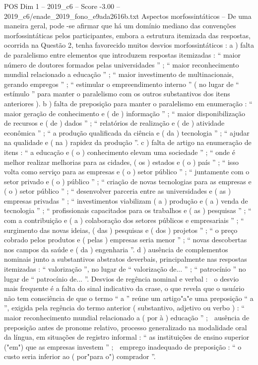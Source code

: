 \begin{textsample}{POS Dim 1 – 2019\_c6 – Score -3.00 – 2019\_c6/enade\_2019\_fono\_e9ada2616b.txt}
Aspectos morfossintáticos – De uma maneira geral, pode -se afirmar que há um domínio mediano das convenções morfossintáticas pelos participantes, embora a estrutura itemizada das respostas, ocorrida na Questão 2, tenha favorecido muitos desvios morfossintáticos : a ) falta de paralelismo entre elementos que introduzem respostas itemizadas : “ maior número de doutores formados pelas universidades ” ; “ maior reconhecimento mundial relacionado a educação ” ; “ maior investimento de multinacionais, gerando empregos ” ; “ estimular o empreendimento interno ” ( no lugar de “ estímulo ” para manter o paralelismo com os outros substantivos dos itens anteriores ). b ) falta de preposição para manter o paralelismo em enumeração : “ maior geração de conhecimento e ( de ) informação ” ; “ maior disponibilização de recursos e ( de ) dados ” ; “ relatórios de realização e ( de ) atividade econômica ” ; “ a produção qualificada da ciência e ( da ) tecnologia ” ; “ ajudar na qualidade e ( na ) rapidez da produção ”. c ) falta de artigo na enumeração de itens : “ a educação e ( o ) conhecimento elevam uma sociedade ” ; “ onde é melhor realizar melhorias para as cidades, ( os ) estados e ( o ) país ” ; “ isso volta como serviço para as empresas e ( o ) setor público ” ; “ juntamente com o setor privado e ( o ) público ” ; “ criação de novas tecnologias para as empresas e ( o ) setor público ” ; “ desenvolver parceria entre as universidades e ( as ) empresas privadas ” ; “ investimentos viabilizam ( a ) produção e ( a ) venda de tecnologia ” ; “ profissionais capacitados para os trabalhos e ( as ) pesquisas ” ; “ com a contribuição e ( a ) colaboração dos setores públicos e empresariais ” ; “ surgimento das novas ideias, ( das ) pesquisas e ( dos ) projetos ” ; “ o preço cobrado pelos produtos e ( pelas ) empresas seria menor ” ; “ novas descobertas nos campos da saúde e ( da ) engenharia ”. d ) ausência de complementos nominais junto a substantivos abstratos deverbais, principalmente nas respostas itemizadas : “ valorização ”, no lugar de “ valorização de... ” ; “ patrocínio ” no lugar de “ patrocínio de... ”.
Desvios de regência nominal e verbal :  o desvio mais frequente é a falta do sinal indicativo da crase, o que revela que o usuário não tem consciência de que o termo “ a ” reúne um artigo"a"e uma preposição “ a ”, exigida pela regência do termo anterior ( substantivo, adjetivo ou verbo ) : “ maior reconhecimento mundial relacionado a ( por à ) educação ” ;  ausência de preposição antes de pronome relativo, processo generalizado na modalidade oral da língua, em situações de registro informal : “ as instituições de ensino superior ("em") que as empresas investem ” ;  emprego inadequado de preposição : “ o custo seria inferior ao ( por"para o") comprador ”.

\end{textsample}
